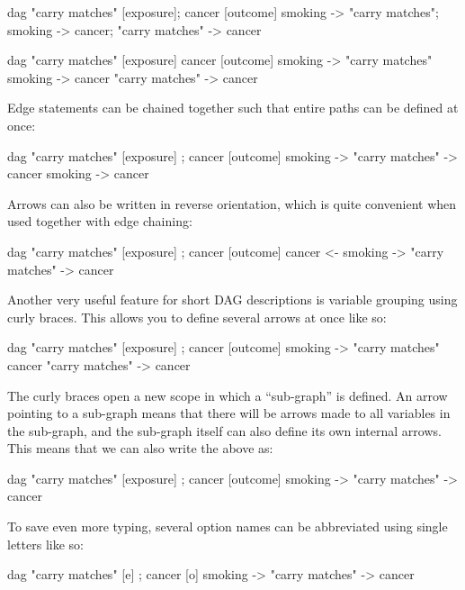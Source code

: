 \documentclass[a4paper]{article} %
\begin{document}
\begin{dagcode}
dag{ 
  "carry matches" [exposure]; cancer [outcome]
  smoking -> "carry matches"; smoking -> cancer;
  "carry matches" -> cancer
}
\end{dagcode}

\begin{dagcode}
dag{ 
  "carry matches" [exposure] cancer [outcome]
  smoking -> "carry matches" smoking -> cancer
  "carry matches" -> cancer
}
\end{dagcode}


Edge statements can be chained together such that entire paths can be defined at once:

\begin{dagcode}
dag{ 
  "carry matches" [exposure] ; cancer [outcome]
  smoking -> "carry matches" -> cancer 
  smoking -> cancer
}
\end{dagcode}

Arrows can also be written in reverse orientation, which is quite convenient when used together with edge chaining:

\begin{dagcode}
dag{ 
  "carry matches" [exposure] ; cancer [outcome]
  cancer <- smoking -> "carry matches" -> cancer 
}
\end{dagcode}

Another very useful feature for short DAG descriptions is variable grouping using curly braces. This allows you to define several arrows at once like so:
\begin{dagcode}
dag{
  "carry matches" [exposure] ; cancer [outcome]
  smoking -> {"carry matches" cancer}
   "carry matches" -> cancer
}
\end{dagcode}

The curly braces open a new scope in which a ``sub-graph'' is defined. An arrow pointing to a sub-graph means that there will be arrows made to all variables in the sub-graph, and the sub-graph itself can also define its own internal arrows. This means that we can also write the above as:
\begin{dagcode}
dag{
  "carry matches" [exposure] ; cancer [outcome]
  smoking -> {"carry matches" -> cancer}
}
\end{dagcode}

To save even more typing, several option names can be abbreviated using single letters like so:
\begin{dagcode}
dag{
  "carry matches" [e] ; cancer [o]
  smoking -> {"carry matches" -> cancer}
}
\end{dagcode}
\end{document}
